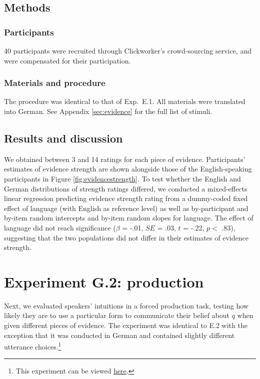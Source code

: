\documentclass[11pt]{article}
\newcommand{\figref}[1]{Figure \ref{#1}}
\newcommand{\appref}[1]{Appendix \ref{#1}}
\begin{document}
\subsection{Methods}

\subsubsection{Participants}

40 participants were recruited through Clickworker's crowd-sourcing service, and were compensated for their participation.

\subsubsection{Materials and procedure}

The procedure was identical to that of Exp.~E.1. All materials were translated into German. See \appref{sec:evidence} for the full list of stimuli.

\subsection{Results and discussion}

We obtained between 3 and 14 ratings for each piece of evidence. Participants' estimates of evidence strength are shown alongside those of the English-speaking participants in  \figref{fig:evidencestrength}. To test whether the English and German distributions of strength ratings differed, we conducted a mixed-effects linear regression predicting evidence strength rating from a dummy-coded fixed effect of language (with English as reference level) as well as by-participant and by-item random intercepts and by-item random slopes for language. The effect of language did not reach significance ($\beta$ = -.01, $SE$ = .03, $t$ = -.22, $p <$ .83), suggesting that the two populations did not differ in their estimates of evidence strength.   

\section{Experiment G.2: production}

Next, we evaluated speakers' intuitions in a forced production task, testing how likely they are to use a particular form to communicate their belief about $q$ when given different pieces of evidence. The experiment was identical to E.2 with the exception that it was conducted in German and contained slightly different utterance choices.\footnote{This experiment can be viewed \href{http://web.stanford.edu/~jdegen/cgi-bin/3_dp_production/modals.html}{here}.}
\end{document}
